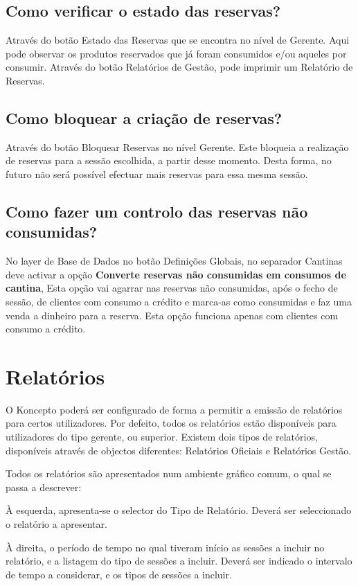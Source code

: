 \documentclass[a4paper,11pt,openany]{memoir}
\begin{document}
\section{Como verificar o estado das reservas?}
Através do botão Estado das Reservas que se encontra no nível de Gerente. Aqui
pode observar os produtos reservados que já foram consumidos e/ou aqueles por
consumir. Através do botão Relatórios de Gestão, pode imprimir um Relatório de
Reservas.

\section{Como bloquear a criação de reservas?}
Através do botão Bloquear Reservas no nível Gerente. Este bloqueia a realização de
reservas para a sessão escolhida, a partir desse momento. Desta forma, no futuro
não será possível efectuar mais reservas para essa mesma sessão.

\section{Como fazer um controlo das reservas não consumidas?}
No layer de Base de Dados no botão Definições Globais, no separador Cantinas
deve activar a opção \textbf{Converte reservas não consumidas em consumos de cantina},
Esta opção vai agarrar nas reservas não consumidas, após o fecho de sessão, de
clientes com consumo a crédito e marca-as como consumidas e faz uma venda a
dinheiro para a reserva. Esta opção funciona apenas com clientes com consumo a
crédito.

\chapter{Relatórios}

O Koncepto poderá ser configurado de forma a permitir a emissão de relatórios para
certos utilizadores. Por defeito, todos os relatórios estão disponíveis para
utilizadores do tipo gerente, ou superior. Existem dois tipos de relatórios, disponíveis
através de objectos diferentes: Relatórios Oficiais e Relatórios Gestão.

Todos os relatórios são apresentados num ambiente gráfico comum, o qual se passa a
descrever:

À esquerda, apresenta-se o selector do Tipo de Relatório. Deverá ser seleccionado
o relatório a apresentar.

À direita, o período de tempo no qual tiveram início as sessões a incluir no relatório,
e a listagem do tipo de sessões a incluir. Deverá ser indicado o intervalo de tempo a
considerar, e os tipos de sessões a incluir.
\end{document}
